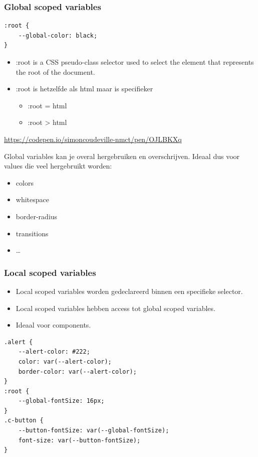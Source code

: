 \documentclass{article}
\begin{document}
\subsubsection{Global scoped variables}

\begin{verbatim}
:root {
    --global-color: black;
}
\end{verbatim}
\begin{itemize}
    \item :root is a CSS pseudo-class selector used to select the element that represents the root of the document.
    \item :root is hetzelfde als html maar is specifieker
    \begin{itemize}
        \item :root = html
        \item :root > html
    \end{itemize}
\end{itemize}

\url{https://codepen.io/simoncoudeville-nmct/pen/OJLBKXq}

Global variables kan je overal hergebruiken en overschrijven. Ideaal dus voor values die veel hergebruikt worden:

\begin{itemize}
    \item colors
    \item whitespace
    \item border-radius
    \item transitions
    \item \dots
\end{itemize}

\subsubsection{Local scoped variables}
\begin{itemize}
    \item Local scoped variables worden gedeclareerd binnen een specifieke selector.
    \item Local scoped variables hebben access tot global scoped variables.
    \item Ideaal voor components.
\end{itemize}

\begin{verbatim}
.alert {
    --alert-color: #222;
    color: var(--alert-color);
    border-color: var(--alert-color);
}
:root {
    --global-fontSize: 16px;
}
.c-button {
    --button-fontSize: var(--global-fontSize);
    font-size: var(--button-fontSize);
}
\end{verbatim}
\end{document}
